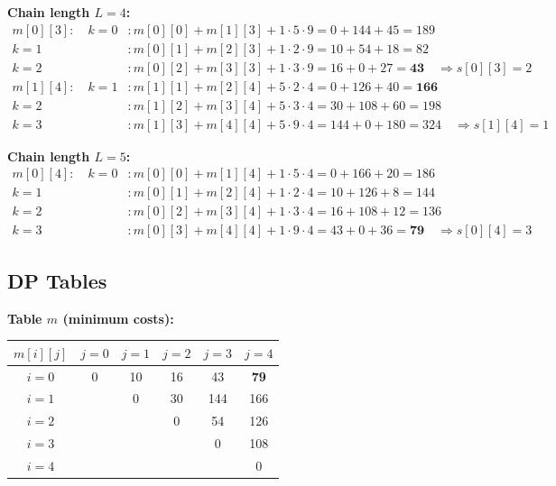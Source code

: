 \documentclass[12pt,a4paper]{article}
\begin{document}
\noindent\textbf{Chain length $L = 4$:}
\begin{align*}
    m[0][3]: \quad k=0&: m[0][0] + m[1][3] + 1 \cdot 5 \cdot 9 = 0 + 144 + 45 = 189 \\
                  k=1&: m[0][1] + m[2][3] + 1 \cdot 2 \cdot 9 = 10 + 54 + 18 = 82 \\
                  k=2&: m[0][2] + m[3][3] + 1 \cdot 3 \cdot 9 = 16 + 0 + 27 = \mathbf{43} \quad \Rightarrow s[0][3] = 2 \\[4pt]
    m[1][4]: \quad k=1&: m[1][1] + m[2][4] + 5 \cdot 2 \cdot 4 = 0 + 126 + 40 = \mathbf{166} \\
                  k=2&: m[1][2] + m[3][4] + 5 \cdot 3 \cdot 4 = 30 + 108 + 60 = 198 \\
                  k=3&: m[1][3] + m[4][4] + 5 \cdot 9 \cdot 4 = 144 + 0 + 180 = 324 \quad \Rightarrow s[1][4] = 1
\end{align*}

\noindent\textbf{Chain length $L = 5$:}
\begin{align*}
    m[0][4]: \quad k=0&: m[0][0] + m[1][4] + 1 \cdot 5 \cdot 4 = 0 + 166 + 20 = 186 \\
                  k=1&: m[0][1] + m[2][4] + 1 \cdot 2 \cdot 4 = 10 + 126 + 8 = 144 \\
                  k=2&: m[0][2] + m[3][4] + 1 \cdot 3 \cdot 4 = 16 + 108 + 12 = 136 \\
                  k=3&: m[0][3] + m[4][4] + 1 \cdot 9 \cdot 4 = 43 + 0 + 36 = \mathbf{79} \quad \Rightarrow s[0][4] = 3
\end{align*}

\subsection*{DP Tables}

\noindent\textbf{Table $m$ (minimum costs):}
\begin{center}
\begin{tabular}{c|ccccc}
    $m[i][j]$ & $j=0$ & $j=1$ & $j=2$ & $j=3$ & $j=4$ \\ \hline
    $i=0$ & 0 & 10 & 16 & 43 & \textbf{79} \\
    $i=1$ & & 0 & 30 & 144 & 166 \\
    $i=2$ & & & 0 & 54 & 126 \\
    $i=3$ & & & & 0 & 108 \\
    $i=4$ & & & & & 0 \\
\end{tabular}
\end{center}
\end{document}
